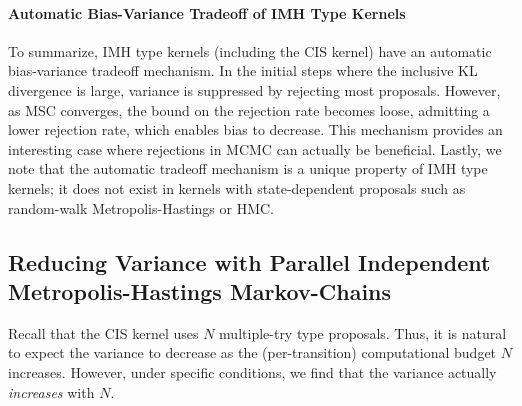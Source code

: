 \vspace{-0.1in}
\paragraph{Automatic Bias-Variance Tradeoff of IMH Type Kernels}
To summarize, IMH type kernels (including the CIS kernel) have an automatic bias-variance tradeoff mechanism.
In the initial steps where the inclusive KL divergence is large, variance is suppressed by rejecting most proposals.
However, as MSC converges, the bound on the rejection rate becomes loose, admitting a lower rejection rate, which enables bias to decrease.
This mechanism provides an interesting case where rejections in MCMC can actually be beneficial.
Lastly, we note that the automatic tradeoff mechanism is a unique property of IMH type kernels; it does not exist in kernels with state-dependent proposals such as random-walk Metropolis-Hastings or HMC.



\subsection{Reducing Variance with Parallel Independent Metropolis-Hastings Markov-Chains}\label{section:cis_bias}
Recall that the CIS kernel uses \(N\) multiple-try type proposals.
Thus, it is natural to expect the variance to decrease as the (per-transition) computational budget \(N\) increases.
However, under specific conditions, we find that the variance actually \textit{increases} with \(N\).

\vspace{-0.1in}
